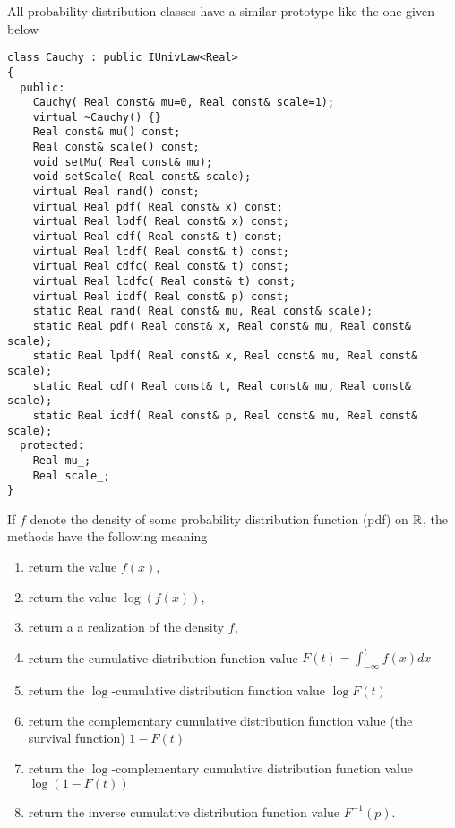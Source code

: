 \documentclass[a4paper,10pt]{article}
\begin{document}
All probability distribution classes have a similar prototype like the one given below
\begin{lstlisting}[style=customcpp,caption=Prototype of probability distribution class (example taken from Cauchy class)]
class Cauchy : public IUnivLaw<Real>
{
  public:
    Cauchy( Real const& mu=0, Real const& scale=1);
    virtual ~Cauchy() {}
    Real const& mu() const;
    Real const& scale() const;
    void setMu( Real const& mu);
    void setScale( Real const& scale);
    virtual Real rand() const;
    virtual Real pdf( Real const& x) const;
    virtual Real lpdf( Real const& x) const;
    virtual Real cdf( Real const& t) const;
    virtual Real lcdf( Real const& t) const;
    virtual Real cdfc( Real const& t) const;
    virtual Real lcdfc( Real const& t) const;
    virtual Real icdf( Real const& p) const;
    static Real rand( Real const& mu, Real const& scale);
    static Real pdf( Real const& x, Real const& mu, Real const& scale);
    static Real lpdf( Real const& x, Real const& mu, Real const& scale);
    static Real cdf( Real const& t, Real const& mu, Real const& scale);
    static Real icdf( Real const& p, Real const& mu, Real const& scale);
  protected:
    Real mu_;
    Real scale_;
}
\end{lstlisting}
If $f$ denote the density of some probability distribution function (pdf) on $\mathbb{R}$,
the methods have the following meaning
\begin{enumerate}
\item {} return the value $f(x)$,
\item {} return the value $\log(f(x))$,
\item {} return a a realization of the density $f$,
\item {} return the cumulative distribution function value $F(t)=\int_{-\infty}^t f(x) dx$
\item {} return the $\log$-cumulative distribution function value
$\log F(t)$
\item {} return the complementary cumulative distribution function
value (the survival function) $1-F(t)$
\item {} return the $\log$-complementary cumulative distribution
function value $\log(1-F(t))$
\item {} return the inverse cumulative distribution function value $F^{-1}(p)$.
\end{enumerate}
\end{document}
